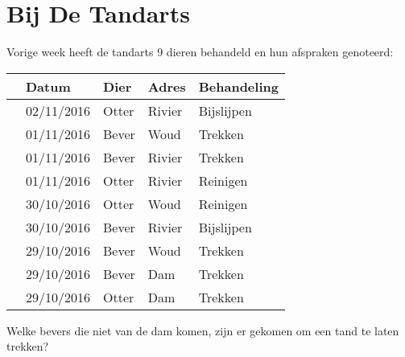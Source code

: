 \documentclass[12pt]{article}
\begin{document}
	\begin{minipage}{\textwidth}
		\section{Bij De Tandarts}
			Vorige week heeft de tandarts 9 dieren behandeld en hun afspraken genoteerd:
			
			\begin{table}[H]
				\centering
				\begin{tabular}{|l|l|l|l|l|}
					\hline
					\ding{51} & \textbf{Datum} & \textbf{Dier} & \textbf{Adres} & \textbf{Behandeling} \\ \hline\hline
					&02/11/2016 & Otter & Rivier & Bijslijpen \\
					&01/11/2016 & Bever & Woud & Trekken \\
					&01/11/2016 & Bever & Rivier & Trekken \\	
					&01/11/2016 & Otter & Rivier & Reinigen \\
					&30/10/2016 & Otter & Woud & Reinigen \\
					&30/10/2016 & Bever & Rivier & Bijslijpen \\
					&29/10/2016 & Bever & Woud & Trekken \\
					&29/10/2016 & Bever & Dam & Trekken \\
					&29/10/2016 & Otter & Dam & Trekken \\
					\hline 
				\end{tabular}
			\end{table}
			
			Welke bevers die niet van de dam komen, zijn er gekomen om een tand te laten trekken?

	\end{minipage} \\ \\ 
		
\end{document}
